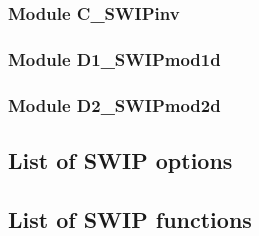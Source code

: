 \documentclass[twoside,a4paper]{article}
\begin{document}
\subsubsection{Module C\_SWIPinv}

\subsubsection{Module D1\_SWIPmod1d}

\subsubsection{Module D2\_SWIPmod2d}

\subsection{List of SWIP options}

\subsection{List of SWIP functions}
\end{document}
